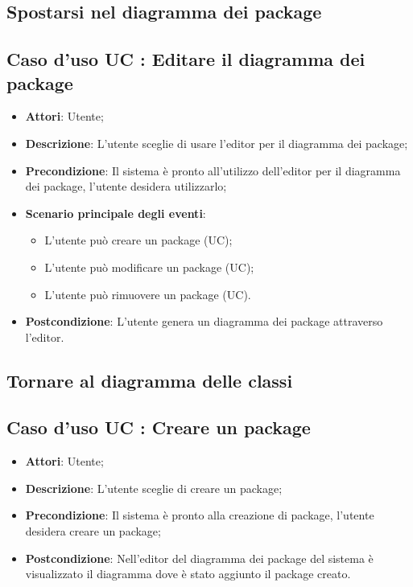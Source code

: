 \documentclass[../AnalisiDeiRequisiti.tex]{subfiles}
\begin{document}
		\subsection{Spostarsi nel diagramma dei package}
		
		\subsection{Caso d'uso UC : Editare il diagramma dei package }
			\begin{itemize}
				\item \textbf{Attori}: Utente;
				\item \textbf{Descrizione}: L'utente sceglie di usare l'editor per il
				diagramma dei package;
				\item \textbf{Precondizione}: Il sistema è pronto all'utilizzo dell'editor per
				il diagramma dei package, l'utente desidera utilizzarlo;
				\item \textbf{Scenario principale degli eventi}:
					\begin{itemize}
						\item L'utente può creare un package (UC);
						\item L'utente può modificare un package (UC);
						\item L'utente può rimuovere un package (UC).
					\end{itemize}
				\item \textbf{Postcondizione}: L'utente genera un diagramma dei package
				attraverso l'editor.
			\end{itemize}
			
		\subsection{Tornare al diagramma delle classi}
		\subsection{Caso d'uso UC : Creare un package}
			\begin{itemize}
				\item \textbf{Attori}: Utente;
				\item \textbf{Descrizione}: L'utente sceglie di creare un package;
				\item \textbf{Precondizione}: Il sistema è pronto alla creazione di package,
				l'utente desidera creare un package;
				\item \textbf{Postcondizione}: Nell'editor del diagramma dei package del
				sistema è visualizzato il diagramma dove è stato aggiunto il package creato.
			\end{itemize}
\end{document}
